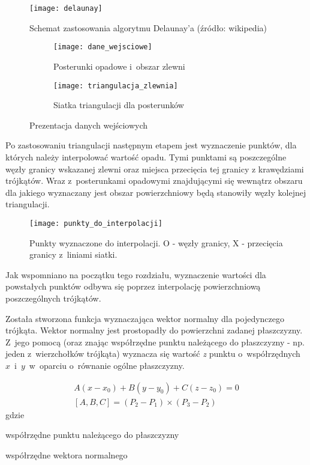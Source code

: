 \begin{figure}[ht]
	\centering
	\texttt{[image: delaunay]}
	\caption{Schemat zastosowania algorytmu Delaunay'a (źródło: wikipedia)}
	\label{fig:delaunay}
\end{figure}

\begin{figure}[ht]
	\centering
\begin{subfigure}[t]{.5\textwidth}
	\centering
	\texttt{[image: dane\_wejsciowe]}
	\caption{Posterunki opadowe i~obszar zlewni}
	\label{fig:dane_wejsciowe}
\end{subfigure}	
	\begin{subfigure}[t]{0.5\textwidth}
	\centering
	\texttt{[image: triangulacja\_zlewnia]}
	\caption{Siatka triangulacji dla posterunków}
	\label{fig:triagnulacja_danych}
\end{subfigure}	
\caption{Prezentacja danych wejściowych}
	
\end{figure}

Po zastosowaniu triangulacji następnym etapem jest wyznaczenie punktów, dla których należy interpolować wartość opadu. Tymi punktami są poszczególne węzły granicy wskazanej zlewni oraz miejsca przecięcia tej granicy z krawędziami trójkątów. Wraz z~posterunkami opadowymi znajdującymi się wewnątrz obszaru dla jakiego wyznaczany jest obszar powierzchniowy będą stanowiły węzły kolejnej triangulacji.


\begin{figure}[ht]
	\centering
	\texttt{[image: punkty\_do\_interpolacji]}
	\caption{Punkty wyznaczone do interpolacji.
	O - węzły granicy, X - przecięcia granicy z~liniami siatki.}
	\label{fig:punkty_interpolacji}
\end{figure}

Jak wspomniano na początku tego rozdziału, wyznaczenie wartości dla powstałych punktów odbywa się poprzez interpolację powierzchniową poszczególnych trójkątów.

Została stworzona funkcja wyznaczająca wektor normalny dla pojedynczego trójkąta. Wektor normalny jest prostopadły do powierzchni zadanej płaszczyzny. Z~jego pomocą (oraz znając współrzędne punktu należącego do płaszczyzny - np. jeden z~wierzchołków trójkąta) wyznacza się wartość \textit{z} punktu o~współrzędnych $x$~i~$y$~w~oparciu o~równanie ogólne płaszczyzny.

\begin{equation*}
\begin{gathered}
A(x - x_0) + B(y - y_0) + C(z - z_0) = 0 \\
[A, B, C] = (P_2 - P_1) \times (P_3 - P_2)
\label{eq:rownanie_plaszczyzny}
\end{gathered}
\end{equation*}
gdzie
\begin{description}[leftmargin=3cm, itemsep=0cm, labelsep=0cm]
	\item[$x_0, y_0, z_0$] współrzędne punktu należącego do płaszczyzny
	\item[$A, B, C$] współrzędne wektora normalnego
\end{description}

